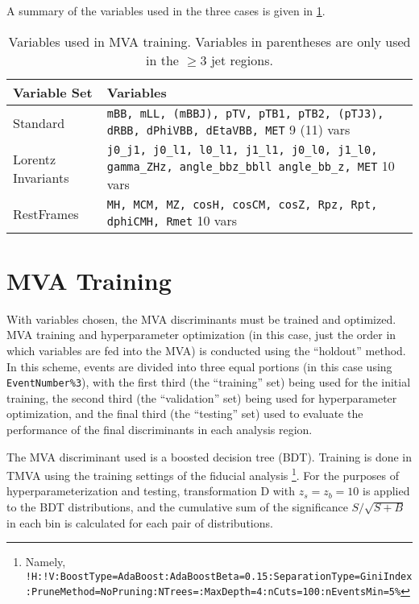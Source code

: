 A summary of the variables used in the three cases is given in \ref{tab:variables}.

\begin{table}[!htbp]\captionsetup{justification=centering}
  \begin{center}\begin{tabular}{l|p{4.5in}}
      \hline\hline
      Variable Set & Variables\\
      \hline
      Standard & \texttt{mBB,\- mLL, (mBBJ),\- pTV,\- pTB1,\- pTB2,\- (pTJ3),\- dRBB,\- dPhiVBB,\- dEtaVBB,\- MET} 9 (11) vars\\
      Lorentz Invariants &  \texttt{j0\_j1,\- j0\_l1,\- l0\_l1,\- j1\_l1,\- j0\_l0,\- j1\_l0,\- gamma\_ZHz,\- angle\_bbz\_bbll\- angle\_bb\_z,\- MET} 10 vars\\
      RestFrames & \texttt{MH,\- MCM,\- MZ,\- cosH,\- cosCM,\- cosZ,\- Rpz,\- Rpt,\- dphiCMH,\- Rmet} 10 vars\\
      \hline\hline
    \end{tabular}
    \caption{Variables used in MVA training.  Variables in parentheses are only used in the $\ge 3$ jet regions.}
    \label{tab:variables}
  \end{center}
\end{table}



\section{MVA Training}
\label{sec:mvatra}
With variables chosen, the MVA discriminants must be trained and optimized.  MVA training and hyperparameter optimization (in this case, just the order in which variables are fed into the MVA) is conducted using the ``holdout'' method.
  In this scheme, events are divided into three equal portions (in this case using \texttt{EventNumber\%3}), with the first third (the ``training'' set) being used for the initial training, the second third (the ``validation'' set) being used for hyperparameter optimization, and the final third (the ``testing'' set) used to evaluate the performance of the final discriminants in each analysis region.

The MVA discriminant used is a boosted decision tree (BDT).  Training is done in TMVA using the training settings of the fiducial analysis \cite{supportnote}\footnote{Namely, \texttt{!H:\-!V:\-BoostType=\-AdaBoost:\-AdaBoostBeta=0.15:\-SeparationType=\-GiniIndex:\-PruneMethod=\-NoPruning:\-NTrees=:\-MaxDepth=4:\-nCuts=100:\-nEventsMin=5\%}}.  For the purposes of hyperparameterization and testing, transformation D with $z_s=z_b=10$ is applied to the BDT distributions, and the cumulative sum of the significance $S/\sqrt{S+B}$ in each bin is calculated for each pair of distributions.  

